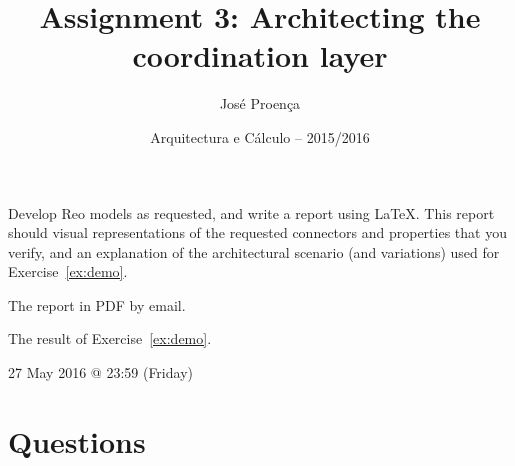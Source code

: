 \documentclass[11pt]{article}
\date{Arquitectura e C\'alculo -- 2015/2016}
\begin{document}
 
 
\title{Assignment 3: Architecting the coordination layer}
\author{Jos\'{e} Proen\c{c}a}
 
\maketitle

 Develop Reo models as requested, and write a report using LaTeX. This report should visual representations of the requested connectors and properties that you verify, and an explanation of the architectural scenario (and variations) used for Exercise~\ref{ex:demo}.

 The report in PDF by email.

 The result of Exercise~\ref{ex:demo}.

 27 May 2016 @ 23:59 (Friday)
 
\section*{Questions}

%
%
%
%
%
\end{document}
